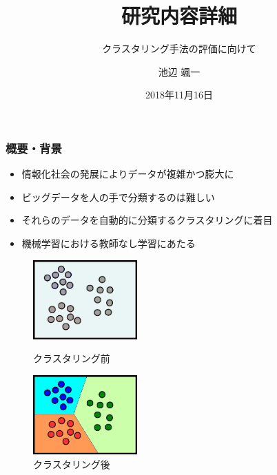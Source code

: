 \documentclass[13pt,dvipdfmx]{beamer}
\title{研究内容詳細}
\subtitle{クラスタリング手法の評価に向けて}
\author{池辺 颯一}
\institute{芝浦工業大学 工学部 通信工学科}
\date{2018年11月16日}
\begin{document}
\begin{frame}\frametitle{}
 \titlepage
\end{frame}

\begin{frame}\frametitle{概要・背景}
\begin{itemize}
 \item 情報化社会の発展によりデータが複雑かつ膨大に
 \item ビッグデータを人の手で分類するのは難しい
 \item それらのデータを自動的に分類するクラスタリングに着目
 \item 機械学習における教師なし学習にあたる
\end{itemize}
\vspace{5mm}
\begin{figure}[htbp]
 \begin{minipage}{0.4\hsize}
  \begin{center}
   \includegraphics[width=40mm]{before_clustering.png}
  \end{center}
  \captionsetup{labelformat=empty,labelsep=none}
  \caption{クラスタリング前}
  \label{fig:one}
 \end{minipage}
\hspace{1cm}
 \begin{minipage}{0.4\hsize}
  \begin{center}
   \includegraphics[width=40mm]{after_clustering.png}
  \end{center}
  \captionsetup{labelformat=empty,labelsep=none}
  \caption{クラスタリング後}
  \label{fig:two}
 \end{minipage}
\end{figure}
\end{frame}
\end{document}
